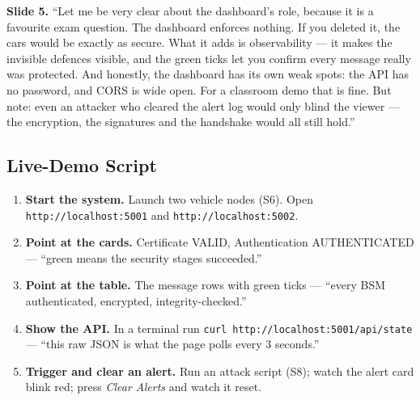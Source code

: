 \documentclass[11pt,a4paper]{article}
\begin{document}
\textbf{Slide 5.} ``Let me be very clear about the dashboard's role, because it
is a favourite exam question. The dashboard enforces nothing. If you deleted it,
the cars would be exactly as secure. What it adds is observability --- it makes
the invisible defences visible, and the green ticks let you confirm every message
really was protected. And honestly, the dashboard has its own weak spots: the API
has no password, and CORS is wide open. For a classroom demo that is fine. But
note: even an attacker who cleared the alert log would only blind the viewer ---
the encryption, the signatures and the handshake would all still hold.''

\subsection{Live-Demo Script}
\begin{enumerate}
  \item \textbf{Start the system.} Launch two vehicle nodes (S6). Open
        \texttt{http://localhost:5001} and \texttt{http://localhost:5002}.
  \item \textbf{Point at the cards.} Certificate VALID, Authentication
        AUTHENTICATED --- ``green means the security stages succeeded.''
  \item \textbf{Point at the table.} The message rows with green ticks ---
        ``every BSM authenticated, encrypted, integrity-checked.''
  \item \textbf{Show the API.} In a terminal run \texttt{curl
        http://localhost:5001/api/state} --- ``this raw JSON is what the page
        polls every 3 seconds.''
  \item \textbf{Trigger and clear an alert.} Run an attack script (S8); watch the
        alert card blink red; press \emph{Clear Alerts} and watch it reset.
\end{enumerate}
\end{document}
